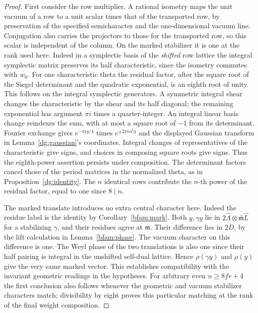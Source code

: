 \begin{proof}
First consider the row multiplier. A rational isometry maps the
unit vacuum of a row to a unit scalar times that of the transported
row, by preservation of the specified semicharacter and the
one-dimensional vacuum line. Conjugation also carries the
projectors to those for the transported row, so this scalar is
independent of the column. On the marked stabilizer it is one
at the rank used here. Indeed in a symplectic basis of the
\emph{shifted} row lattice the integral symplectic matrix
preserves its half characteristic, since the isometry commutes
with \(w_0\). For one characteristic theta the residual factor,
after the square root of the Siegel determinant and the quadratic
exponential, is an eighth root of unity. This follows on the
integral symplectic generators. A symmetric integral shear
changes the characteristic by the shear and its half diagonal;
the remaining exponential has argument \(\pi i\) times a
quarter-integer. An integral linear basis change reindexes the
sum, with at most a square root of \(-1\) from its determinant.
Fourier exchange gives \(e^{-\pi i g/4}\) times
\(e^{\pm 2\pi i\alpha^t\eta}\) and the displayed Gaussian
transform in Lemma~\ref{dg:gaussian}'s coordinates.
Integral changes of representatives of the characteristic give
signs, and choices in composing square roots give signs.
Thus the eighth-power assertion persists under composition.
The determinant factors cancel those of the period matrices in
the normalized theta, as in Proposition~\ref{dg:identity}. The
\(n\) identical rows contribute the \(n\)-th power of the
residual factor, equal to one since \(8\mid n\).

The marked translate introduces no extra central character here.
Indeed the residue label is the identity by
Corollary~\ref{bfam:mark}. Both \(y,\gamma y\) lie in
\(2\widehat\Lambda\otimes\bar{\mathfrak m}\widehat L\) for a
stabilizing \(\gamma\), and their residues agree at
\(\mathfrak m\). Their difference lies in \(2D\), by the lift
calculation in Lemma~\ref{bfam:phase}. The vacuum character on
this difference is one. The Weyl phase of the two translations is
also one since their half pairing is integral in the unshifted
self-dual lattice. Hence \(\rho(\gamma y)\) and \(\rho(y)\)
give the very same marked vector. This establishes compatibility
with the invariant geometric readings in the hypotheses. For
arbitrary even \(n\ge8fr+4\) the first conclusion also follows
whenever the geometric and vacuum stabilizer characters match;
divisibility by eight proves this particular matching at the
rank of the final weight composition.


\end{proof}
